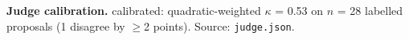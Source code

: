 \noindent\textbf{Judge calibration.} calibrated: quadratic-weighted $\kappa$ = 0.53 on $n$ = 28 labelled proposals (1 disagree by $\ge$2 points). Source: \texttt{judge.json}.